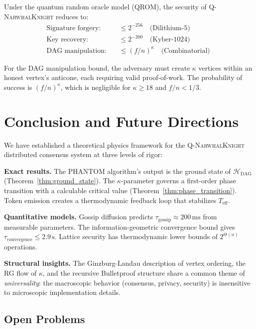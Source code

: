 \documentclass[12pt,a4paper,twocolumn]{article}
\newcommand{\qnk}{\textsc{Q-NarwhalKnight}}
\newcommand{\Hdag}{\mathcal{H}_{\mathrm{DAG}}}
\newcommand{\kparam}{\kappa}
\newcommand{\Teff}{T_{\mathrm{eff}}}
\begin{document}
Under the quantum random oracle model (QROM), the security of \qnk{} reduces to:
\begin{align}
\text{Signature forgery:}& \quad \leq 2^{-256} \quad \text{(Dilithium-5)} \\
\text{Key recovery:}& \quad \leq 2^{-200} \quad \text{(Kyber-1024)} \\
\text{DAG manipulation:}& \quad \leq (f/n)^{\kparam} \quad \text{(Combinatorial)}
\end{align}

For the DAG manipulation bound, the adversary must create $\kparam$ vertices within an honest vertex's anticone, each requiring valid proof-of-work. The probability of success is $(f/n)^\kparam$, which is negligible for $\kparam \geq 18$ and $f/n < 1/3$.

\section{Conclusion and Future Directions}
\label{sec:conclusion}

We have established a theoretical physics framework for the \qnk{} distributed consensus system at three levels of rigor:

\textbf{Exact results.} The PHANTOM algorithm's output is the ground state of $\Hdag$ (Theorem~\ref{thm:ground_state}). The $\kparam$-parameter governs a first-order phase transition with a calculable critical value (Theorem~\ref{thm:phase_transition}). Token emission creates a thermodynamic feedback loop that stabilizes $\Teff$.

\textbf{Quantitative models.} Gossip diffusion predicts $\tau_{\mathrm{gossip}} \approx 200\,\text{ms}$ from measurable parameters. The information-geometric convergence bound gives $\tau_{\mathrm{convergence}} \leq 2.9\,\text{s}$. Lattice security has thermodynamic lower bounds of $2^{\Theta(n)}$ operations.

\textbf{Structural insights.} The Ginzburg-Landau description of vertex ordering, the RG flow of $\kparam$, and the recursive Bulletproof structure share a common theme of \emph{universality}: the macroscopic behavior (consensus, privacy, security) is insensitive to microscopic implementation details.

\subsection{Open Problems}
\end{document}
